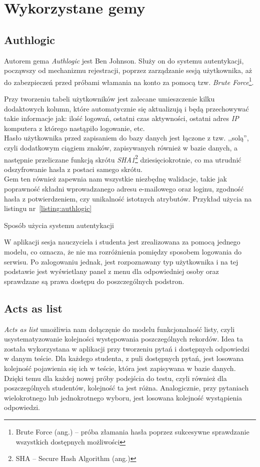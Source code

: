 \documentclass[12pt,twoside]{report}
\begin{document}
\section{Wykorzystane gemy}
\subsection{Authlogic}\label{sec:authlogic}
Autorem gema \emph{Authlogic} jest Ben Johnson. Służy on do systemu autentykacji,
począwszy od mechanizmu rejestracji, poprzez zarządzanie sesją użytkownika, aż do
zabezpieczeń przed próbami włamania na konto za pomocą tzw. \emph{Brute
Force}\footnote{Brute Force (ang.) -- próba złamania hasła poprzez sukcesywne sprawdzanie
wszystkich dostępnych możliwości}.


Przy tworzeniu tabeli użytkowników jest zalecane umieszczenie kilku dodaktowych kolumn,
które automatycznie się aktualizują i będą przechowywać takie informacje jak: ilość
logowań, ostatni czas aktywności, ostatni adres \emph{IP} komputera z którego nastąpiło
logowanie, etc.\\
Hasło użytkownika przed zapisaniem do bazy danych jest łączone z tzw. ,,solą'', czyli
dodatkowym ciągiem znaków, zapisywanych również w bazie danych, a następnie przeliczane
funkcją skrótu \emph{SHA1}\footnote{SHA -- Secure Hash Algorithm (ang.)}
dziesięciokrotnie, co ma utrudnić odszyfrowanie hasła z postaci samego skrótu.\\
Gem ten również zapewnia nam wszystkie niezbędnę walidacje, takie jak poprawność składni
wprowadzanego adresu e-mailowego oraz loginu, zgodność hasła z potwierdzeniem, czy
unikalność istotnych atrybutów. Przykład użycia na listingu nr~\ref{listing:authlogic}

\begin{listing}
  
  \caption{Sposób użycia systemu autentykacji}
  \label{listing:authlogic}
\end{listing}


W aplikacji sesja nauczyciela i studenta jest zrealizowana za pomocą jednego modelu, co
oznacza, że nie ma rozróżnienia pomiędzy sposobem logowania do serwisu. Po zalogowaniu
jednak, jest rozpoznawany typ użytkownika i na tej podstawie jest wyświetlany panel z menu
dla odpowiedniej osoby oraz sprawdzane są prawa dostępu do poszczególnych podstron.

\subsection{Acts as list}\label{sec:acts_as_list}
\emph{Acts as list} umożliwia nam dołączęnie do modelu funkcjonalność listy, czyli
usystematyzowanie kolejności występowania poszczególnych rekordów. Idea ta została
wykorzystana w aplikacji przy tworzeniu pytań i dostępnych odpowiedzi w danym teście.
Dla każdego studenta, z puli dostępnych pytań, jest losowana kolejność pojawienia się ich w
teście, która jest zapisywana w bazie danych. Dzięki temu dla każdej nowej próby podejścia
do testu, czyli również dla poszczególnych studentów, kolejność ta jest różna.
Analogicznie, przy pytaniach wielokrotnego lub jednokrotnego wyboru, jest losowana
kolejność wystąpienia odpowiedzi.
\end{document}
